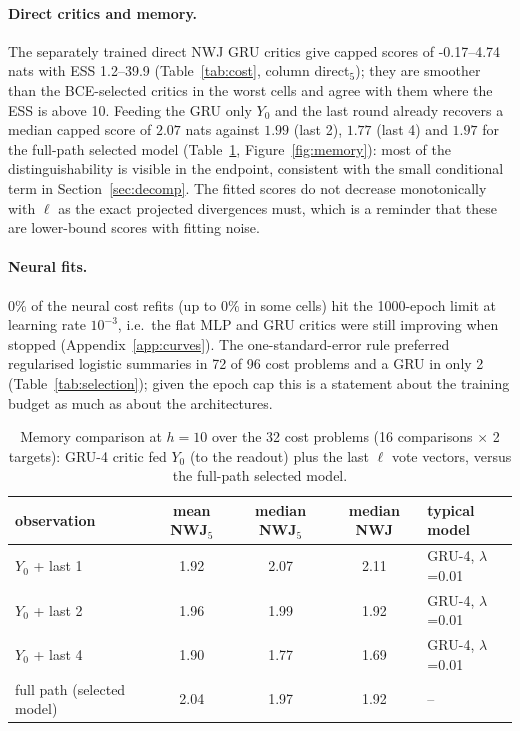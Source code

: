 \documentclass[10pt]{article}
\begin{document}
\paragraph{Direct critics and memory.} The separately trained direct NWJ GRU critics give capped scores of -0.17--4.74 nats with ESS 1.2--39.9 (Table~\ref{tab:cost}, column direct$_5$); they are smoother than the BCE-selected critics in the worst cells and agree with them where the ESS is above 10. Feeding the GRU only $Y_0$ and the last round already recovers a median capped score of $2.07$ nats against $1.99$ (last 2), $1.77$ (last 4) and $1.97$ for the full-path selected model (Table~\ref{tab:memory}, Figure~\ref{fig:memory}): most of the distinguishability is visible in the endpoint, consistent with the small conditional term in Section~\ref{sec:decomp}. The fitted scores do not decrease monotonically with $\ell$ as the exact projected divergences must, which is a reminder that these are lower-bound scores with fitting noise.

\paragraph{Neural fits.} 0\% of the neural cost refits (up to 0\% in some cells) hit the 1000-epoch limit at learning rate $10^{-3}$, i.e.\ the flat MLP and GRU critics were still improving when stopped (Appendix~\ref{app:curves}). The one-standard-error rule preferred regularised logistic summaries in 72 of 96 cost problems and a GRU in only 2 (Table~\ref{tab:selection}); given the epoch cap this is a statement about the training budget as much as about the architectures.

\begin{table}[htbp]
\centering
\small
\caption{Memory comparison at $h=10$ over the 32 cost problems (16 comparisons $\times$ 2 targets): GRU-4 critic fed $Y_0$ (to the readout) plus the last $\ell$ vote vectors, versus the full-path selected model.}\label{tab:memory}
\begin{tabular}{l ccc l}
\toprule
observation & mean NWJ$_5$ & median NWJ$_5$ & median NWJ & typical model \\
\midrule
$Y_0$ + last 1 & 1.92 & 2.07 & 2.11 & GRU-4, $\lambda$=0.01 \\
$Y_0$ + last 2 & 1.96 & 1.99 & 1.92 & GRU-4, $\lambda$=0.01 \\
$Y_0$ + last 4 & 1.90 & 1.77 & 1.69 & GRU-4, $\lambda$=0.01 \\
full path (selected model) & 2.04 & 1.97 & 1.92 & -- \\
\bottomrule
\end{tabular}
\end{table}
\end{document}

